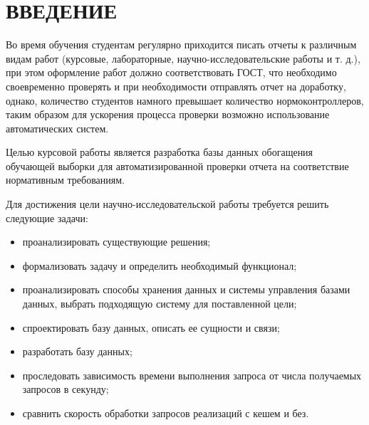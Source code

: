 \chapter*{ВВЕДЕНИЕ}

Во время обучения студентам регулярно приходится писать отчеты к различным видам работ (курсовые, лабораторные, научно-исследовательские работы и т. д.), при этом оформление работ должно соответствовать ГОСТ, что необходимо своевременно проверять и при необходимости отправлять отчет на доработку, однако, количество студентов намного превышает количество нормоконтроллеров, таким образом для ускорения процесса проверки возможно использование автоматических систем.

Целью курсовой работы является разработка базы данных обогащения обучающей выборки для автоматизированной проверки отчета на соответствие нормативным требованиям.

Для достижения цели научно-исследовательской работы требуется решить следующие задачи:
\begin{itemize}
	\item проанализировать существующие решения;
	\item формализовать задачу и определить необходимый функционал;
	\item проанализировать способы хранения данных и системы управления базами данных, выбрать подходящую систему для поставленной цели;
	\item спроектировать базу данных, описать ее сущности и связи;
	\item разработать базу данных;
	\item проследовать зависимость времени выполнения запроса от числа получаемых запросов в секунду;
	\item сравнить скорость обработки запросов реализаций с кешем и без.
\end{itemize}